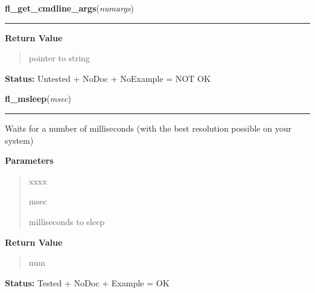 \hspace{.8\funcindent}\begin{boxedminipage}{\funcwidth}

    \raggedright \textbf{fl\_get\_cmdline\_args}(\textit{numargs})

    \vspace{-1.5ex}

    \rule{\textwidth}{0.5\fboxrule}
\setlength{\parskip}{2ex}
\setlength{\parskip}{1ex}
      \textbf{Return Value}
    \vspace{-1ex}

      \begin{quote}
      pointer to string

      \end{quote}

\textbf{Status:} Untested + NoDoc + NoExample = NOT OK



    \end{boxedminipage}

    \label{xformslib:library:fl_msleep}

    \vspace{0.5ex}

\hspace{.8\funcindent}\begin{boxedminipage}{\funcwidth}

    \raggedright \textbf{fl\_msleep}(\textit{msec})

    \vspace{-1.5ex}

    \rule{\textwidth}{0.5\fboxrule}
\setlength{\parskip}{2ex}
    Waits for a number of milliseconds (with the best resolution possible 
    on your system)

\setlength{\parskip}{1ex}
      \textbf{Parameters}
      \vspace{-1ex}

      \begin{quote}
        \begin{Ventry}{xxxx}

          \item[msec]

          milliseconds to sleep

        \end{Ventry}

      \end{quote}

      \textbf{Return Value}
    \vspace{-1ex}

      \begin{quote}
      num

      \end{quote}

\textbf{Status:} Tested + NoDoc + Example = OK



    \end{boxedminipage}

